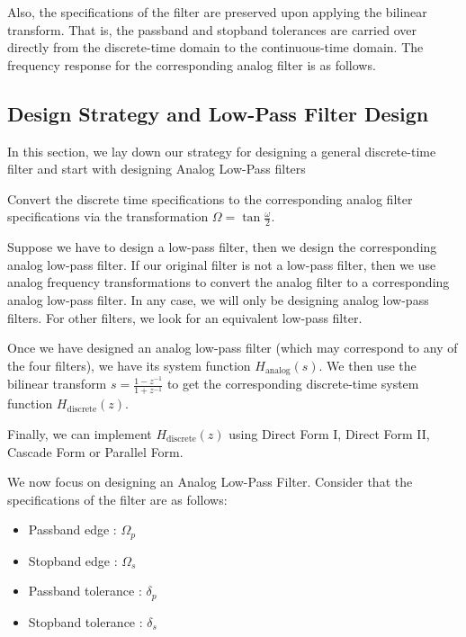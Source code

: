 \documentclass{article}
\theoremstyle{definition}
\newcommand\ddfrac[2]{\frac{\displaystyle #1}{\displaystyle #2}}
\begin{document}
Also, the specifications of the filter are preserved upon applying the bilinear transform. That is, the passband and stopband tolerances are carried over directly from the discrete-time domain to the continuous-time domain. The frequency response for the corresponding analog filter is as follows. \medskip

\subsection{Design Strategy and Low-Pass Filter Design}

In this section, we lay down our strategy for designing a general discrete-time filter and start with designing Analog Low-Pass filters

\begin{steps}
    \item Convert the discrete time specifications to the corresponding analog filter specifications via the transformation $\Omega = \tan \ddfrac{\omega}{2}$.
    \item Suppose we have to design a low-pass filter, then we design the corresponding analog low-pass filter. If our original filter is not a low-pass filter, then we use analog frequency transformations to convert the analog filter to a corresponding analog low-pass filter. In any case, we will only be designing analog low-pass filters. For other filters, we look for an equivalent low-pass filter.
    \item Once we have designed an analog low-pass filter (which may correspond to any of the four filters), we have its system function $H_{\text{analog}}(s)$. We then use the bilinear transform $s = \frac{1-z^{-1}}{1+z^{-1}}$ to get the corresponding discrete-time system function $H_{\text{discrete}}(z)$.
    \item Finally, we can implement $H_{\text{discrete}}(z)$ using Direct Form I, Direct Form II, Cascade Form or Parallel Form.
\end{steps}

We now focus on designing an Analog Low-Pass Filter. Consider that the specifications of the filter are as follows:

\begin{itemize}
    \item Passband edge : $\Omega_p$
    \item Stopband edge : $\Omega_s$
    \item Passband tolerance : $\delta_p$
    \item Stopband tolerance : $\delta_s$
\end{itemize}
\end{document}
